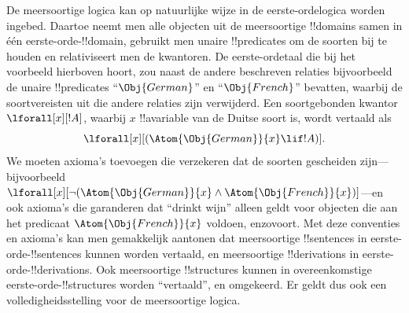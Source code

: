 \documentclass[../../../include/open-logic-section]{subfiles}
\begin{document}
De meersoortige logica kan op natuurlijke wijze in de
eerste-ordelogica worden ingebed. Daartoe neemt men alle objecten uit
de meersoortige !!{domain}s samen in één eerste-orde-!!{domain}, gebruikt
men unaire !!{predicate}s om de soorten bij te houden en relativiseert
men de kwantoren. De eerste-ordetaal die bij het voorbeeld hierboven
hoort, zou naast de andere beschreven relaties bijvoorbeeld de unaire
!!{predicate}s ``$\Obj{German}$'' en ``$\Obj{French}$'' bevatten, waarbij de
soortvereisten uit die andere relaties zijn verwijderd. Een
soortgebonden kwantor $\lforall[x][!A]$, waarbij $x$ !!a{variable} van de
Duitse soort is, wordt vertaald als
\[
\lforall[x][(\Atom{\Obj{German}}{x} \lif !A)].
\]
We moeten axioma's toevoegen die verzekeren dat de soorten gescheiden
zijn---bijvoorbeeld
$\lforall[x][\lnot (\Atom{\Obj{German}}{x} \land
  \Atom{\Obj{French}}{x})]$---en ook axioma's die garanderen dat
``drinkt wijn'' alleen geldt voor objecten die aan het predicaat
$\Atom{\Obj{French}}{x}$ voldoen, enzovoort. Met deze conventies en
axioma's kan men gemakkelijk aantonen dat meersoortige !!{sentence}s
in eerste-orde-!!{sentence}s kunnen worden vertaald, en meersoortige
!!{derivation}s in eerste-orde-!!{derivation}s. Ook meersoortige
!!{structure}s kunnen in overeenkomstige eerste-orde-!!{structure}s
worden ``vertaald'', en omgekeerd. Er geldt dus ook een
volledigheidsstelling voor de meersoortige logica.
\end{document}
